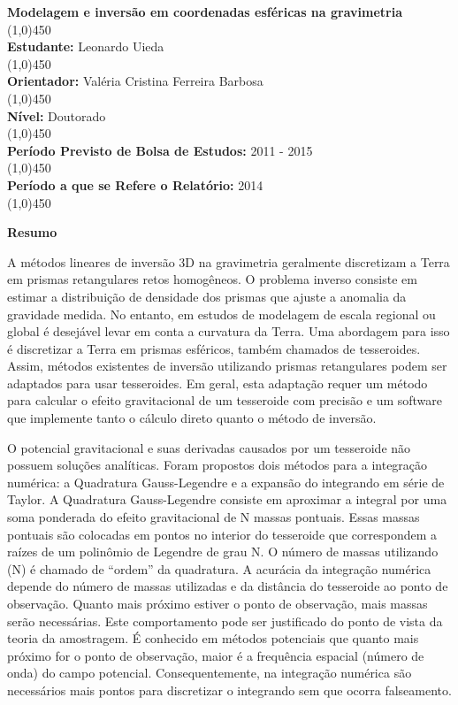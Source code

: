 \documentclass[12pt]{letter}
\begin{document}
\thispagestyle{fancy}

\begin{flushleft}
\textbf{Modelagem e inversão em coordenadas esféricas na gravimetria}\\
\line(1,0){450}
\\\textbf{Estudante:} Leonardo Uieda\\
\line(1,0){450}
\\\textbf{Orientador:} Valéria Cristina Ferreira Barbosa\\
\line(1,0){450}
\\\textbf{Nível:} Doutorado\\
\line(1,0){450}
\\\textbf{Período Previsto de Bolsa de Estudos:} 2011 - 2015\\
\line(1,0){450}
\\\textbf{Período a que se Refere o Relatório:} 2014\\
\line(1,0){450}
\end{flushleft}

\textbf{Resumo}

A métodos lineares de inversão 3D na gravimetria
geralmente discretizam a Terra
em prismas retangulares retos homogêneos.
O problema inverso consiste
em estimar a distribuição de densidade dos prismas
que ajuste a anomalia da gravidade medida.
No entanto,
em estudos de modelagem
de escala regional ou global
é desejável levar em conta
a curvatura da Terra.
Uma abordagem para isso
é discretizar a Terra em prismas esféricos,
também chamados de tesseroides.
Assim,
métodos existentes de inversão
utilizando prismas retangulares
podem ser adaptados
para usar tesseroides.
Em geral,
esta adaptação requer
um método para calcular
o efeito gravitacional de um tesseroide
com precisão
e um software que implemente
tanto o cálculo direto
quanto o método de inversão.

O potencial gravitacional e suas derivadas
causados por um tesseroide
não possuem soluções analíticas.
Foram propostos dois métodos para a integração numérica:
a Quadratura Gauss-Legendre
e a expansão do integrando em série de Taylor.
A Quadratura Gauss-Legendre
consiste em aproximar a integral
por uma soma ponderada
do efeito gravitacional de N massas pontuais.
Essas massas pontuais
são colocadas em pontos
no interior do tesseroide
que correspondem a raízes
de um polinômio de Legendre de grau N.
O número de massas utilizando (N)
é chamado de ``ordem'' da quadratura.
A acurácia da integração numérica
depende do número de massas utilizadas
e da distância do tesseroide ao ponto de observação.
Quanto mais próximo estiver o ponto de observação,
mais massas serão necessárias.
Este comportamento
pode ser justificado
do ponto de vista da teoria da amostragem.
É conhecido em métodos potenciais
que quanto mais próximo for o ponto de observação,
maior é a frequência espacial (número de onda)
do campo potencial.
Consequentemente,
na integração numérica são necessários
mais pontos para discretizar o integrando
sem que ocorra falseamento.
\end{document}
